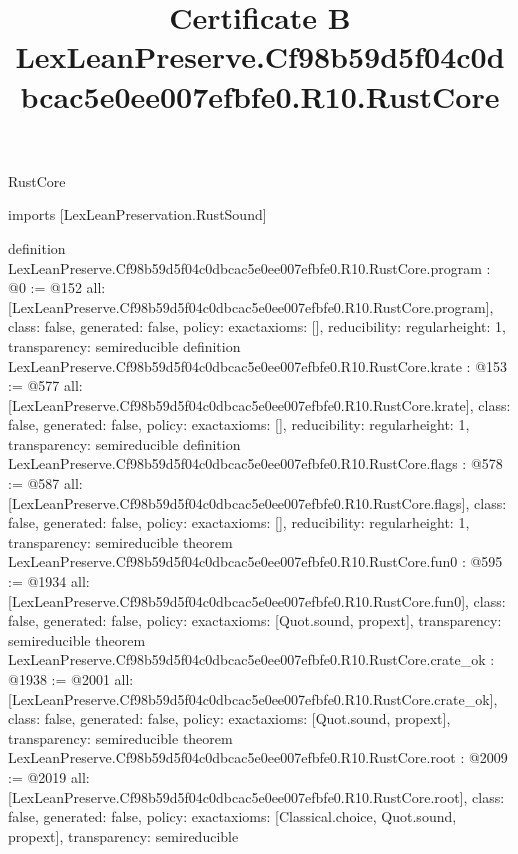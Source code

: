 \begin{lexlean}{RustCore}
\title{Certificate B LexLeanPreserve.Cf98b59d5f04c0dbcac5e0ee007efbfe0.R10.RustCore}
\begin{coremodule}
imports [LexLeanPreservation.RustSound]

definition LexLeanPreserve.Cf98b59d5f04c0dbcac5e0ee007efbfe0.R10.RustCore.program : @0 := @152 {
  all: [LexLeanPreserve.Cf98b59d5f04c0dbcac5e0ee007efbfe0.R10.RustCore.program],
  class: false,
  generated: false,
  policy: exact{axioms: []},
  reducibility: regular{height: 1},
  transparency: semireducible
}
definition LexLeanPreserve.Cf98b59d5f04c0dbcac5e0ee007efbfe0.R10.RustCore.krate : @153 := @577 {
  all: [LexLeanPreserve.Cf98b59d5f04c0dbcac5e0ee007efbfe0.R10.RustCore.krate],
  class: false,
  generated: false,
  policy: exact{axioms: []},
  reducibility: regular{height: 1},
  transparency: semireducible
}
definition LexLeanPreserve.Cf98b59d5f04c0dbcac5e0ee007efbfe0.R10.RustCore.flags : @578 := @587 {
  all: [LexLeanPreserve.Cf98b59d5f04c0dbcac5e0ee007efbfe0.R10.RustCore.flags],
  class: false,
  generated: false,
  policy: exact{axioms: []},
  reducibility: regular{height: 1},
  transparency: semireducible
}
theorem LexLeanPreserve.Cf98b59d5f04c0dbcac5e0ee007efbfe0.R10.RustCore.fun0 : @595 := @1934 {
  all: [LexLeanPreserve.Cf98b59d5f04c0dbcac5e0ee007efbfe0.R10.RustCore.fun0],
  class: false,
  generated: false,
  policy: exact{axioms: [Quot.sound, propext]},
  transparency: semireducible
}
theorem LexLeanPreserve.Cf98b59d5f04c0dbcac5e0ee007efbfe0.R10.RustCore.crate_ok : @1938 := @2001 {
  all: [LexLeanPreserve.Cf98b59d5f04c0dbcac5e0ee007efbfe0.R10.RustCore.crate_ok],
  class: false,
  generated: false,
  policy: exact{axioms: [Quot.sound, propext]},
  transparency: semireducible
}
theorem LexLeanPreserve.Cf98b59d5f04c0dbcac5e0ee007efbfe0.R10.RustCore.root : @2009 := @2019 {
  all: [LexLeanPreserve.Cf98b59d5f04c0dbcac5e0ee007efbfe0.R10.RustCore.root],
  class: false,
  generated: false,
  policy: exact{axioms: [Classical.choice, Quot.sound, propext]},
  transparency: semireducible
}


\end{coremodule}
\end{lexlean}
